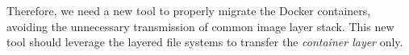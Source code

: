 Therefore, we need a new tool to properly migrate the Docker containers, avoiding the unnecessary transmission of common image layer stack.   
This new tool should leverage the layered file systems to  transfer the \textit{container layer} only.




